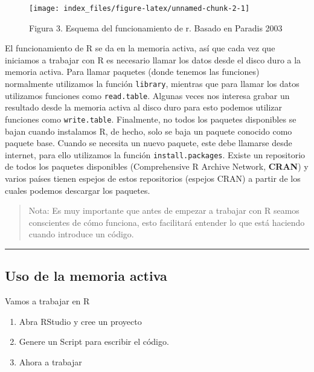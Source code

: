 \documentclass[
]{article}
\providecommand{\tightlist}{%
  \setlength{\itemsep}{0pt}\setlength{\parskip}{0pt}}
\begin{document}
\begin{figure}

{\centering \texttt{[image: index\_files/figure-latex/unnamed-chunk-2-1]} 

}

\caption{Figura 3. Esquema del funcionamiento de r. Basado en Paradis 2003}\label{fig:unnamed-chunk-2}
\end{figure}

El funcionamiento de R se da en la memoria activa, así que cada vez que
iniciamos a trabajar con R es necesario llamar los datos desde el disco
duro a la memoria activa. Para llamar paquetes (donde tenemos las
funciones) normalmente utilizamos la función \texttt{library}, mientras
que para llamar los datos utilizamos funciones como \texttt{read.table}.
Algunas veces nos interesa grabar un resultado desde la memoria activa
al disco duro para esto podemos utilizar funciones como
\texttt{write.table}. Finalmente, no todos los paquetes disponibles se
bajan cuando instalamos R, de hecho, solo se baja un paquete conocido
como paquete base. Cuando se necesita un nuevo paquete, este debe
llamarse desde internet, para ello utilizamos la función
\texttt{install.packages}. Existe un repositorio de todos los paquetes
disponibles (Comprehensive R Archive Network, \textbf{CRAN}) y varios
países tienen espejos de estos repositorios (espejos CRAN) a partir de
los cuales podemos descargar los paquetes.

\begin{quote}
Nota: Es muy importante que antes de empezar a trabajar con R seamos
conscientes de cómo funciona, esto facilitará entender lo que está
haciendo cuando introduce un código.
\end{quote}

\begin{center}\rule{0.5\linewidth}{0.5pt}\end{center}

\hypertarget{uso-de-la-memoria-activa}{%
\subsection{Uso de la memoria activa}\label{uso-de-la-memoria-activa}}

Vamos a trabajar en R

\begin{enumerate}
\def\labelenumi{\arabic{enumi}.}
\tightlist
\item
  Abra RStudio y cree un proyecto
\item
  Genere un Script para escribir el código.
\item
  Ahora a trabajar
\end{enumerate}
\end{document}
